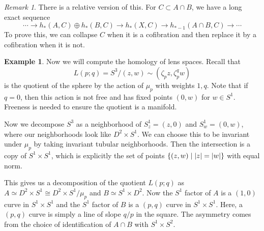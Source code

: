 \documentclass[leqno, openany]{memoir}
\theoremstyle{definition}
\newtheorem{exm}[thm]{Example}
\theoremstyle{remark}
\newtheorem{rmk}[thm]{Remark}
\theoremstyle{plain}
\theoremstyle{definition}
\theoremstyle{remark}
\begin{document}
\begin{rmk}
    There is a relative version of this. For $C \subset A \cap B$, we have a long exact sequence
    \[ \cdots \to h_*(A,C) \oplus h_*(B,C) \to h_*(X,C) \to h_{*-1}(A \cap B, C) \to \cdots \]
    To prove this, we can collapse $C$ when it is a cofibration and then replace it by a cofibration when it is not.
\end{rmk}

\begin{exm}
    Now we will compute the homology of lens spaces. Recall that 
    \[ L(p;q) = S^3/(z,w) \sim (\zeta_p z, \zeta_p^q w) \]
    is the quotient of the sphere by the action of $\mu_p$ with weights $1,q$. Note that if $q=0$, then this action is not free and has fixed points $(0,w)$ for $w \in S^1$. Freeness is needed to ensure the quotient is a manifold.

    Now we decompose $S^3$ as a neighborhood of $S^1_z = (z,0)$ and $S^1_w = (0,w)$, where our neighborhoods look like $D^2 \times S^1$. We can choose this to be invariant under $\mu_p$ by taking invariant tubular neighborhoods. Then the intersection is a copy of $S^1 \times S^1$, which is explicitly the set of points $\qty{(z,w) \mid \abs{z} = \abs{w}}$ with equal norm.

    This gives us a decomposition of the quotient $L(p;q)$ as $A \simeq D^2 \times S^1 \cong D^2 \times S^1 / \mu_p$ and $B \simeq S^1 \times D^2$. Now the $S^1$ factor of $A$ is a $(1,0)$ curve in $S^1 \times S^1$ and the $S^1$ factor of $B$ is a $(p,q)$ curve in $S^1 \times S^1$. Here, a $(p,q)$ curve is simply a line of slope $q/p$ in the square. The asymmetry comes from the choice of identification of $A \cap B$ with $S^1 \times S^2$.


\end{exm}
\end{document}
